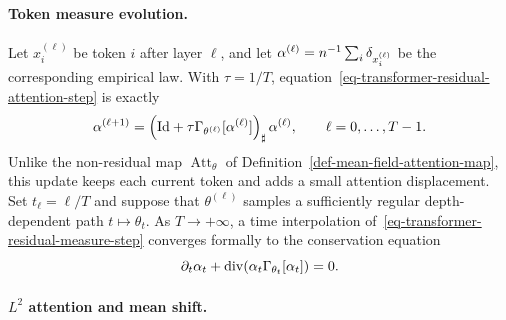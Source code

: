 \paragraph{Token measure evolution.}

Let \(x_i^{(\ell)}\) be token \(i\) after layer \(\ell\), and let \(\alpha^{(\ell)}=n^{-1}\sum_i\delta_{x_i^{(\ell)}}\) be the corresponding empirical law. With \(\tau=1/T\), equation~\eqref{eq-transformer-residual-attention-step} is exactly
\begin{equation}\label{eq-transformer-residual-measure-step}
	\alpha^{(\ell+1)}
	=
	\left(
		\mathrm{Id}+\tau\Gamma_{\theta^{(\ell)}}[\alpha^{(\ell)}]
	\right)_\sharp
	\alpha^{(\ell)},
	\qquad
	\ell=0,\ldots,T-1.
\end{equation}
Unlike the non-residual map \(\operatorname{Att}_\theta\) of Definition~\ref{def-mean-field-attention-map}, this update keeps each current token and adds a small attention displacement.
Set \(t_\ell=\ell/T\) and suppose that \(\theta^{(\ell)}\) samples a sufficiently regular depth-dependent path \(t\mapsto\theta_t\). As \(T\to+\infty\), a time interpolation of~\eqref{eq-transformer-residual-measure-step} converges formally to the conservation equation
\begin{equation}\label{eq-transformer-mean-field-pde}
	\partial_t\alpha_t
	+
	\operatorname{div}\!\left(\alpha_t\Gamma_{\theta_t}[\alpha_t]\right)
	=
	0.
\end{equation}



\paragraph{$L^2$ attention and mean shift.}

